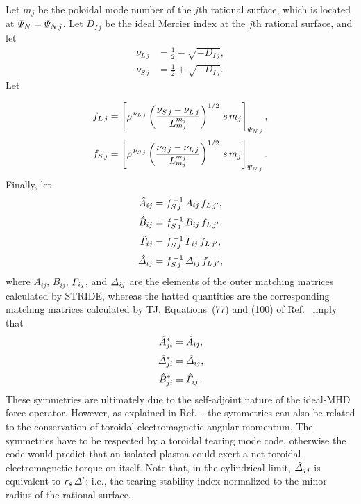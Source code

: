 \documentclass[12pt,prb,aps,notitlepage]{revtex4-1}
\begin{document}
Let $m_j$ be the poloidal mode number of the $j$th rational surface, which is located at ${\mit\Psi}_N= {\mit\Psi}_{N\,j}$. Let $D_{I\,j}$ be the ideal
Mercier index at the $j$th rational surface, and
let
\begin{align}
\nu_{L\,j} &=\frac{1}{2}-\sqrt{-D_{I\,j}},\\[0.5ex]
\nu_{S\,j} &=\frac{1}{2}+\sqrt{-D_{I\,j}}.
\end{align}
Let

\begin{align}
f_{L\,j} &= \left[\rho^{\,\nu_{L\,j}}
\left(\frac{\nu_{S\,j}-\nu_{L\,j}}{L_{m_j}^{m_j}}\right)^{1/2}\,s\,m_j
\right]_{{\mit\Psi}_{N\,j}},\\[0.5ex]
f_{S\,j} &= \left[\rho^{\,\nu_{S\,j}}
\left(\frac{\nu_{S\,j}-\nu_{L\,j}}{L_{m_j}^{m_j}}\right)^{1/2}\,s\,m_j
\right]_{{\mit\Psi}_{N\,j}}.
\end{align}
Finally, let
\begin{align}
\hat{A}_{ij}&= f_{S\,j}^{\,-1}\,A_{ij}\,f_{L\,j'},\\[0.5ex]
\hat{B}_{ij}&= f_{S\,j}^{\,-1}\,B_{ij}\,f_{L\,j'},\\[0.5ex]
\hat{\mit\Gamma}_{ij}&= f_{S\,j}^{\,-1}\,{\mit\Gamma}_{ij}\,f_{L\,j'},\\[0.5ex]
\hat{\mit\Delta}_{ij}&= f_{S\,j}^{\,-1}\,{\mit\Delta}_{ij}\,f_{L\,j'},
\end{align}
where $A_{ij}$, $B_{ij}$, ${\mit\Gamma}_{ij}$, and ${\mit\Delta}_{ij}$ are the elements of the outer matching matrices
calculated by STRIDE, whereas the hatted quantities are the  corresponding matching matrices calculated by TJ. 
Equations~(77) and (100) of Ref.~ imply that
\begin{align}
\hat{A}_{ji}^\ast &= \hat{A}_{ij},\\[0.5ex]
\hat{\mit\Delta}_{ji}^\ast &= \hat{\mit\Delta}_{ij},\label{sym}\\[0.5ex]
\hat{B}_{ji}^\ast &= \hat{\mit\Gamma}_{ij}.
\end{align}
These symmetries are ultimately due to the self-adjoint nature of the ideal-MHD force operator. However, as explained
in Ref.~, the symmetries can also be related to the conservation of toroidal electromagnetic angular momentum. The
symmetries have to be respected by a toroidal tearing mode code, otherwise the code would predict that an isolated 
plasma could exert a net toroidal electromagnetic torque on itself. Note that, in the cylindrical limit, $\hat{\mit\Delta}_{jj}$ is equivalent to $r_s\,{\mit\Delta}'$: i.e.,
the tearing stability index normalized to the minor radius of the rational surface. 
\end{document}
